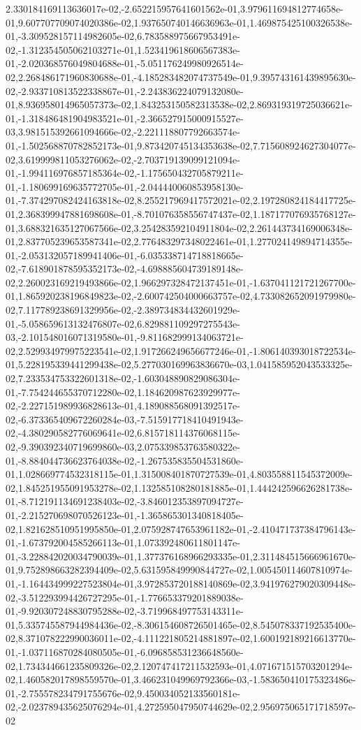 2.330184169113636017e-02,-2.652215957641601562e-01,3.979611694812774658e-01,9.607707709074020386e-02,1.937650740146636963e-01,1.469875425100326538e-01,-3.309528157114982605e-02,6.783588975667953491e-02,-1.312354505062103271e-01,1.523419618606567383e-01,-2.020368576049804688e-01,-5.051176249980926514e-02,2.268486171960830688e-01,-4.185283482074737549e-01,9.395743161439895630e-02,-2.933710813522338867e-01,-2.243836224079132080e-01,8.936958014965057373e-02,1.843253150582313538e-02,2.869319319725036621e-01,-1.318486481904983521e-01,-2.366527915000915527e-03,3.981515392661094666e-02,-2.221118807792663574e-01,-1.502568870782852173e-01,9.873420745134353638e-02,7.715608924627304077e-02,3.619999811053276062e-02,-2.703719139099121094e-01,-1.994116976857185364e-02,-1.175650432705879211e-01,-1.180699169635772705e-01,-2.044440060853958130e-01,-7.374297082424163818e-02,8.255217969417572021e-02,2.197280824184417725e-01,2.368399947881698608e-01,-8.701076358556747437e-02,1.187177076935768127e-01,3.688321635127067566e-02,3.254283592104911804e-02,2.261443734169006348e-01,2.837705239653587341e-02,2.776483297348022461e-01,1.277024149894714355e-01,-2.053132057189941406e-01,-6.035338714718818665e-02,-7.618901878595352173e-02,-4.698885604739189148e-02,2.260023169219493866e-02,1.966297328472137451e-01,-1.637041121721267700e-01,1.865920238196849823e-02,-2.600742504000663757e-02,4.733082652091979980e-02,7.117789238691329956e-02,-2.389734834432601929e-01,-5.058659613132476807e-02,6.829881109297275543e-03,-2.101548016071319580e-01,-9.811682999134063721e-02,2.529934979975223541e-02,1.917266249656677246e-01,-1.806140393018722534e-01,5.228195339441299438e-02,5.277030169963836670e-03,1.041585952043533325e-02,7.233534753322601318e-02,-1.603048890829086304e-01,-7.754244655370712280e-02,1.184620987623929977e-02,-2.227151989936828613e-01,4.189088568091392517e-02,-6.373365409672260284e-03,-7.515917718410491943e-02,-4.380290582776069641e-02,6.815718114376068115e-02,-9.390392340719699860e-03,2.075339853763580322e-01,-8.884044736623764038e-02,-1.267535835504531860e-01,1.028669774532318115e-01,1.315008401870727539e-01,4.803558811545372009e-02,1.845251955091953278e-02,1.132585108280181885e-01,1.444242596626281738e-01,-8.712191134691238403e-02,-3.846012353897094727e-01,-2.215270698070526123e-01,-1.365865301340818405e-02,1.821628510951995850e-01,2.075928747653961182e-01,-2.410471737384796143e-01,-1.673792004585266113e-01,1.073392480611801147e-01,-3.228842020034790039e-01,1.377376168966293335e-01,2.311484515666961670e-01,9.752898663282394409e-02,5.631595849990844727e-02,1.005450114607810974e-01,-1.164434999227523804e-01,3.972853720188140869e-02,3.941976279020309448e-02,-3.512293994426727295e-01,-1.776653379201889038e-01,-9.920307248830795288e-02,-3.719968497753143311e-01,5.335745587944984436e-02,-8.306154608726501465e-02,8.545078337192535400e-02,8.371078222990036011e-02,-4.111221805214881897e-02,1.600192189216613770e-01,-1.037116870284080505e-01,-6.096858531236648560e-02,1.734344661235809326e-02,2.120747417211532593e-01,4.071671515703201294e-02,1.460582017898559570e-01,3.466231049969792366e-03,-1.583650410175323486e-01,-2.755578234791755676e-02,9.450034052133560181e-02,-2.023789435625076294e-01,4.272595047950744629e-02,2.956975065171718597e-02
